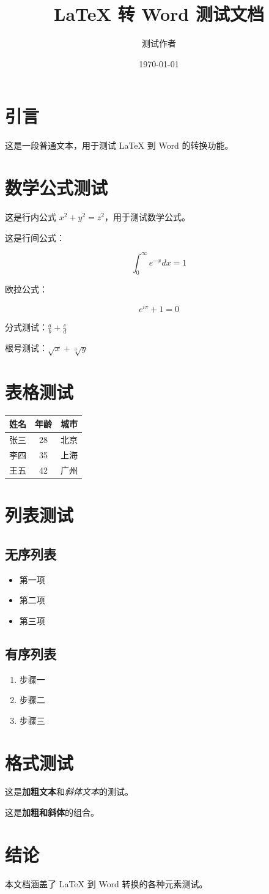 \documentclass{article}
\title{LaTeX 转 Word 测试文档}
\author{测试作者}
\date{\today}
\begin{document}
\section{引言}

这是一段普通文本，用于测试 LaTeX 到 Word 的转换功能。

\section{数学公式测试}

这是行内公式 $x^2 + y^2 = z^2$，用于测试数学公式。

这是行间公式：

\[
\int_0^\infty e^{-x} dx = 1
\]

欧拉公式：

\[
e^{i\pi} + 1 = 0
\]

分式测试：$\frac{a}{b} + \frac{c}{d}$

根号测试：$\sqrt{x} + \sqrt[3]{y}$

\section{表格测试}

\begin{tabular}{|c|c|c|}
\hline
姓名 & 年龄 & 城市 \\
\hline
张三 & 28 & 北京 \\
\hline
李四 & 35 & 上海 \\
\hline
王五 & 42 & 广州 \\
\hline
\end{tabular}

\section{列表测试}

\subsection{无序列表}

\begin{itemize}
\item 第一项
\item 第二项
\item 第三项
\end{itemize}

\subsection{有序列表}

\begin{enumerate}
\item 步骤一
\item 步骤二
\item 步骤三
\end{enumerate}

\section{格式测试}

这是\textbf{加粗文本}和\textit{斜体文本}的测试。

这是\textbf{加粗和斜体}的组合。

\section{结论}

本文档涵盖了 LaTeX 到 Word 转换的各种元素测试。
\end{document}
